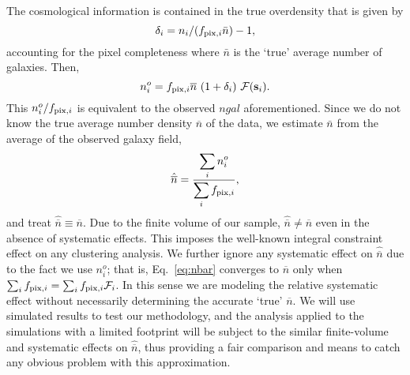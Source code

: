 The cosmological information is contained in the true overdensity that is given by
\begin{equation}
\delta_{i} = n_i/(f_{{\rm pix},i}\bar{n})-1,\label{eq:overden}
\end{equation}
accounting for the pixel completeness where $\bar{n}$ is the `true' average number of galaxies. Then,
\begin{equation}
n_{i}^{o}= f_{{\rm pix},i}\overline{n}~(1 + \delta_{i})~ \mathcal{F}(\textbf{s}_{i}).\label{eq:nobsi}
\end{equation}
This $n_{i}^{o}/f_{{\rm pix},i}$ is equivalent to the observed $ngal$ aforementioned.
Since we do not know the true average number density $\overline{n}$ of the data, we estimate $\bar{n}$ from the average of the observed galaxy field,
\begin{equation}\label{eq:nbar}
\hat{\overline{n}} = \frac{\displaystyle\sum_{i} n^{o}_{i}  }{\displaystyle\sum_{i} f_{{\rm pix},i}},
\end{equation}
and treat $\hat{\overline{n}} \equiv \overline{n}$.
Due to the finite volume of our sample, $\hat{\overline{n}} \neq \overline{n}$ even in the absence of systematic effects. This imposes the well-known integral constraint effect on any clustering analysis. We further ignore any systematic effect on $\hat{\overline{n}}$ due to the fact we use $n^{o}_{i}$; that is, Eq.~\ref{eq:nbar} converges to $\overline{n}$ only when $\sum_{i} f_{{\rm pix},i}= \sum_{i} f_{{\rm pix},i}\mathcal{F}_i$. 
In this sense we are modeling the relative systematic effect without necessarily determining the accurate `true' $\overline{n}$. We will use simulated results to test our methodology, and the analysis applied to the simulations with a limited footprint will be subject to the similar finite-volume and systematic effects on $\hat{\overline{n}}$, thus providing a fair comparison and means to catch any obvious problem with this approximation.\\

